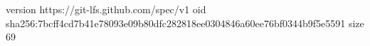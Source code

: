 version https://git-lfs.github.com/spec/v1
oid sha256:7bcff4cd7b41e78093e09b80dfc282818ee0304846a60ee76bf0344b9f5e5591
size 69
